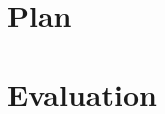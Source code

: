 \documentclass[11pt]{article}
\begin{document}
\section{Plan}

\section{Evaluation}



\end{document}
